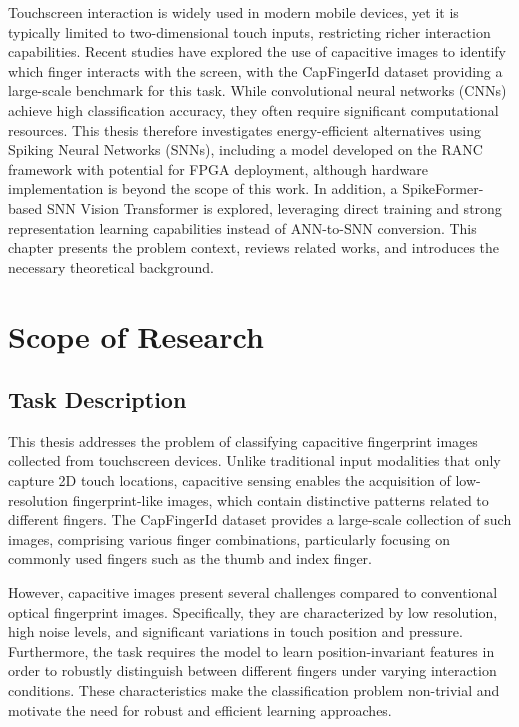 \documentclass[../main.tex]{subfiles}
\begin{document}
Touchscreen interaction is widely used in modern mobile devices, yet it is typically limited to two-dimensional touch inputs, restricting richer interaction capabilities. Recent studies have explored the use of capacitive images to identify which finger interacts with the screen, with the CapFingerId dataset providing a large-scale benchmark for this task. While convolutional neural networks (CNNs) achieve high classification accuracy, they often require significant computational resources. This thesis therefore investigates energy-efficient alternatives using Spiking Neural Networks (SNNs), including a model developed on the RANC\cite{RANC} framework with potential for FPGA deployment, although hardware implementation is beyond the scope of this work. In addition, a SpikeFormer-based SNN Vision Transformer is explored, leveraging direct training and strong representation learning capabilities instead of ANN-to-SNN conversion. This chapter presents the problem context, reviews related works, and introduces the necessary theoretical background.

\section{Scope of Research}
\subsection{Task Description}

This thesis addresses the problem of classifying capacitive fingerprint images collected from touchscreen devices. Unlike traditional input modalities that only capture 2D touch locations, capacitive sensing enables the acquisition of low-resolution fingerprint-like images, which contain distinctive patterns related to different fingers. The CapFingerId \cite{CapfingerId} dataset provides a large-scale collection of such images, comprising various finger combinations, particularly focusing on commonly used fingers such as the thumb and index finger.

However, capacitive images present several challenges compared to conventional optical fingerprint images. Specifically, they are characterized by low resolution, high noise levels, and significant variations in touch position and pressure. Furthermore, the task requires the model to learn position-invariant features in order to robustly distinguish between different fingers under varying interaction conditions. These characteristics make the classification problem non-trivial and motivate the need for robust and efficient learning approaches.
\end{document}
